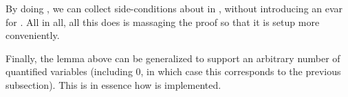 \documentclass[xetex,format=acmlarge,screen=true,authorversion=true]{acmart-modified}
\begin{document}
By doing , we can collect side-conditions about 
in , without introducing an evar for . All in all, all this does
is massaging the proof so that it is setup more conveniently.

Finally, the lemma above can be generalized to support an arbitrary number of
quantified variables (including 0, in which case this corresponds to the
previous subsection). This is in essence how  is
implemented.


\def\tightlist{}




\end{document}
